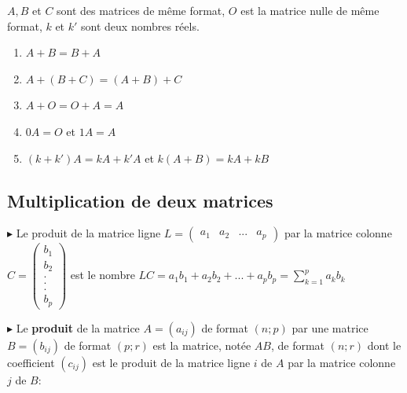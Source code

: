 \documentclass[french]{book}
\begin{document}
\begin{prop}
   
    $A,B$ et $C$ sont des matrices de même format, $O$ est la matrice nulle de même format, $k$ et $k'$ sont deux nombres réels.


   
   \begin{enumerate}
   \item $A+B=B+A$
   
   \item $A+(B+C)=(A+B)+C$
   
   \item $A+O=O+A=A$
   
   \item $0A=O$ et $1A=A$
   
   \item $(k+k')A=kA+k'A$ et $k(A+B)=kA+kB$ 
   \end{enumerate}
\end{prop}   

\subsection{Multiplication de deux matrices}
   
  \begin{defn} 
   $\blacktriangleright$ Le produit de la matrice ligne $L=\begin{pmatrix}
   a_{1}&a_{2}&...&a_{p}
   \end{pmatrix}$ par la matrice colonne $C= \begin{pmatrix}
   b_{1}\\
   b_{2}\\
   .\\
   .\\
   .\\
   b_{p}
   
   \end{pmatrix}$
      est le nombre $LC=a_{1}b_{1}+a_{2}b_{2}+...+a_{p}b_{p}=\displaystyle\sum_{k=1}^{p}a_{k}b_{k}$
      
   $\blacktriangleright$ Le \textbf{produit} de la matrice $A=\left( a_{ij}\right) $ de format $(n;p)$ par une matrice $B=\left( b_{ij}\right) $ de format $(p;r)$ est la matrice, notée $AB$, de format $(n;r)$ dont le coefficient $(c_{ij})$ est le produit de la matrice ligne $i$ de $A$ par la matrice colonne $j$ de $B$:
   
 \begin{center}
 \end{center}
 \end{defn}
 
\end{document}
